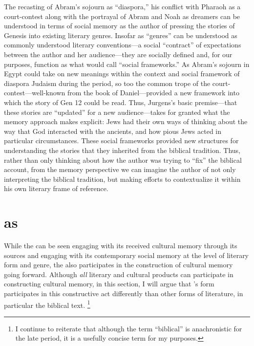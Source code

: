 The recasting of Abram's sojourn as ``diaspora,'' his conflict with Pharaoh as a court-contest along with the portrayal of Abram and Noah as dreamers can be understood in terms of social memory as the author of \ga pressing the stories of Genesis into existing literary genres. Insofar as ``genres'' can be understood as commonly understood literary conventions---a social ``contract'' of expectations between the author and her audience---they are socially defined and, for our purposes, function as what \halbwachs would call ``social frameworks.'' As Abram's sojourn in Egypt could take on new meanings within the context and social framework of diaspora Judaism during the \secondtemple period, so too the common trope of the court-contest---well-known from the book of Daniel---provided a new framework into which the story of Gen 12 could be read. Thus, Jurgens's basic premise---that these stories are ``updated'' for a new audience---takes for granted what the memory approach makes explicit: \secondtemple Jews had their own ways of thinking about the way that God interacted with the ancients, and how pious Jews acted in particular circumstances. These social frameworks provided new structures for understanding the stories that they inherited from the biblical tradition. Thus, rather than only thinking about how the author was trying to ``fix'' the biblical account, from the memory perspective we can imagine the author of \ga not only interpreting the biblical tradition, but making efforts to contextualize it within his own literary frame of reference.

\section{\ga as \psa}

While the \ga can be seen engaging with its received cultural memory through its sources and engaging with its contemporary social memory at the level of literary form and genre, the \ga also participates in the construction of cultural memory going forward. Although \emph{all} literary and cultural products can participate in constructing cultural memory, in this section, I will argue that \ga's \psgraphic form participates in this constructive act differently than other forms of literature, in particular the biblical text.%
\footnote{I continue to reiterate that although the term ``biblical'' is anachronistic for the late \secondtemple period, it is a usefully concise term for my purposes.}

